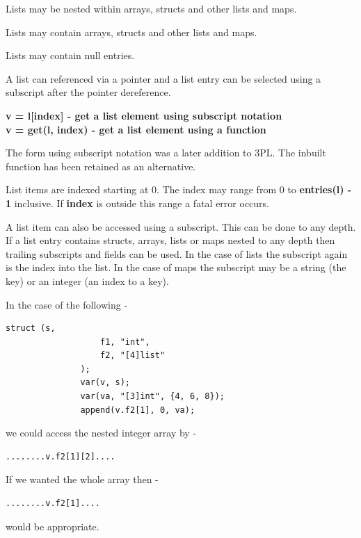             Lists may be nested within arrays, structs and other lists and maps.
            
            Lists may contain arrays, structs and other lists and maps.
            
            Lists may contain null entries.
            
            A list can referenced via a pointer and a list entry can be selected
            using a subscript after the pointer dereference.
            
            {\bf v = l[index] - get a list element using subscript notation}\\
            {\bf v = get(l, index) - get a list element using a function}
            
            The form using subscript notation was a later addition to 3PL.
            The inbuilt function has been retained as an alternative.
            
            List items are indexed starting at 0. The index may range from 0 to
            {\bf entries(l) - 1} inclusive. If {\bf index} is outside this range
            a fatal error occurs.
            
            A list item can also be accessed using a subscript. This can be done
            to any depth. If a list entry contains structs, arrays, lists or maps
            nested to any depth then trailing subscripts and fields can be used.
            In the case of lists the subscript again is the index into the list.
            In the case of maps the subscript may be a string (the key) or an
            integer (an index to a key).
            
            In the case of the following -
            
            \begin{lstlisting}[gobble=12, language=threepl]
               struct (s,
                   f1, "int",
                   f2, "[4]list"
               );
               var(v, s);
               var(va, "[3]int", {4, 6, 8});
               append(v.f2[1], 0, va);
            \end{lstlisting}
            we could access the nested integer array by -
            \begin{lstlisting}[gobble=12, language=threepl]
               ........v.f2[1][2]....
            \end{lstlisting}
            If we wanted the whole array then -
            \begin{lstlisting}[gobble=12, language=threepl]
               ........v.f2[1]....
            \end{lstlisting}
            would be appropriate.
            
